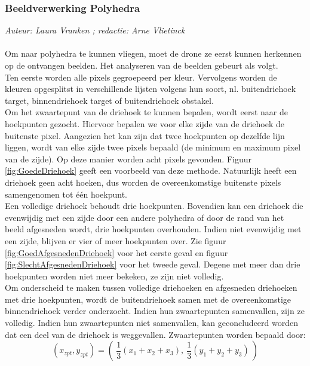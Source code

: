\subsubsection{Beeldverwerking Polyhedra}
{\em Auteur: Laura Vranken ; redactie: Arne Vlietinck}
\\
\\
\noindent
Om naar polyhedra te kunnen vliegen, moet de drone ze eerst kunnen herkennen op de ontvangen beelden. Het analyseren van de beelden gebeurt als volgt. 
\\
Ten eerste worden alle pixels gegroepeerd per kleur. Vervolgens worden de kleuren opgesplitst in verschillende lijsten volgens hun soort, nl. buitendriehoek target, binnendriehoek target of buitendriehoek obstakel. 
\\
Om het zwaartepunt van de driehoek te kunnen bepalen, wordt eerst naar de hoekpunten gezocht. Hiervoor bepalen we voor elke zijde van de driehoek de buitenste pixel. Aangezien het kan zijn dat twee hoekpunten op dezelfde lijn liggen, wordt van elke zijde twee pixels bepaald (de minimum en maximum pixel van de zijde). Op deze manier worden acht pixels gevonden. Figuur \ref{fig:GoedeDriehoek} geeft een voorbeeld van deze methode. Natuurlijk heeft een driehoek geen acht hoeken, dus worden de overeenkomstige buitenste pixels samengenomen tot één hoekpunt. 
\\
Een volledige driehoek behoudt drie hoekpunten. Bovendien kan een driehoek die evenwijdig met een zijde door een andere polyhedra of door de rand van het beeld afgesneden wordt, drie hoekpunten overhouden. Indien niet evenwijdig met een zijde, blijven er vier of meer hoekpunten over. Zie figuur \ref{fig:GoedAfgesnedenDriehoek} voor het eerste geval en figuur \ref{fig:SlechtAfgesnedenDriehoek} voor het tweede geval. Degene met meer dan drie hoekpunten worden niet meer bekeken, ze zijn niet volledig.
\\
Om onderscheid te maken tussen volledige driehoeken en afgesneden driehoeken met drie hoekpunten, wordt de buitendriehoek samen met de overeenkomstige binnendriehoek verder onderzocht. Indien hun zwaartepunten samenvallen, zijn ze volledig. Indien hun zwaartepunten niet samenvallen, kan geconcludeerd worden dat een deel van de driehoek is weggevallen. Zwaartepunten worden bepaald door: \begin{equation}
(x_{zpt},y_{zpt}) = ( \ \frac{1}{3}(x_1 + x_2 + x_3) , \ \frac{1}{3}(y_1 + y_2 + y_3) \ )
\end{equation}
